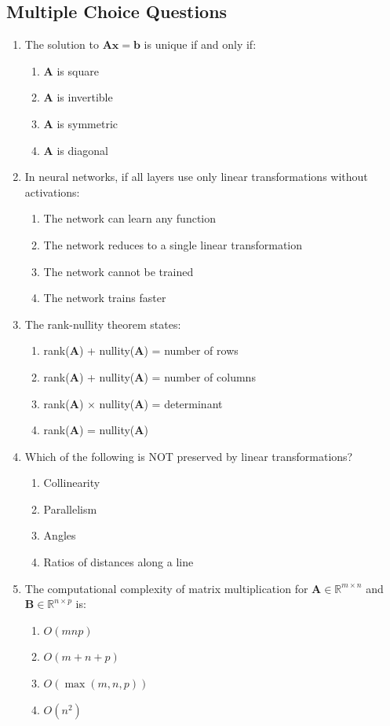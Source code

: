 \documentclass[12pt,a4paper]{article}
\theoremstyle{definition}
\begin{document}
\subsection{Multiple Choice Questions}

\begin{enumerate}[resume]
\item The solution to $\mathbf{Ax} = \mathbf{b}$ is unique if and only if:
\begin{enumerate}[label=(\alph*)]
\item $\mathbf{A}$ is square
\item $\mathbf{A}$ is invertible
\item $\mathbf{A}$ is symmetric
\item $\mathbf{A}$ is diagonal
\end{enumerate}

\item In neural networks, if all layers use only linear transformations without activations:
\begin{enumerate}[label=(\alph*)]
\item The network can learn any function
\item The network reduces to a single linear transformation
\item The network cannot be trained
\item The network trains faster
\end{enumerate}

\item The rank-nullity theorem states:
\begin{enumerate}[label=(\alph*)]
\item rank($\mathbf{A}$) + nullity($\mathbf{A}$) = number of rows
\item rank($\mathbf{A}$) + nullity($\mathbf{A}$) = number of columns
\item rank($\mathbf{A}$) $\times$ nullity($\mathbf{A}$) = determinant
\item rank($\mathbf{A}$) = nullity($\mathbf{A}$)
\end{enumerate}

\item Which of the following is NOT preserved by linear transformations?
\begin{enumerate}[label=(\alph*)]
\item Collinearity
\item Parallelism
\item Angles
\item Ratios of distances along a line
\end{enumerate}

\item The computational complexity of matrix multiplication for $\mathbf{A} \in \mathbb{R}^{m \times n}$ and $\mathbf{B} \in \mathbb{R}^{n \times p}$ is:
\begin{enumerate}[label=(\alph*)]
\item $O(mnp)$
\item $O(m + n + p)$
\item $O(\max(m,n,p))$
\item $O(n^2)$
\end{enumerate}
\end{enumerate}
\end{document}
